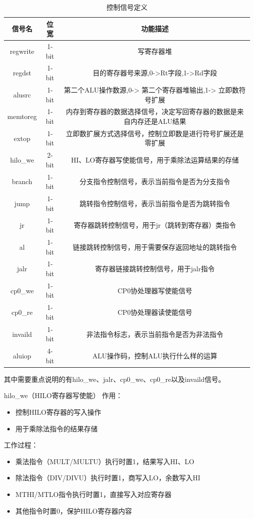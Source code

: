 \begin{table}[h]
\centering
\begin{tabular}{|c|c|c|} \hline 
	信号名&  位宽& 功能描述\\ \hline 
	regwrite&  1-bit& 写寄存器堆\\ \hline 
	regdst&  1-bit& 目的寄存器号来源,0->Rt字段,1->Rd字段\\ \hline 
	alusrc&  1-bit& 第二个ALU操作数源,0-> 第二个寄存器堆输出,1->
	立即数符号扩展\\ \hline 
	memtoreg&  1-bit& 内存到寄存器的数据选择信号，决定写回寄存器的数据是来自内存还是ALU结果\\ \hline 
	extop&  1-bit& 立即数扩展方式选择信号，控制立即数是进行符号扩展还是零扩展\\ \hline 
	hilo\_we&  2-bit& HI、LO寄存器写使能信号，用于乘除法运算结果的存储\\ \hline 
	branch&  1-bit& 分支指令控制信号，表示当前指令是否为分支指令\\ \hline 
	jump&  1-bit& 跳转指令控制信号，表示当前指令是否为跳转指令\\ \hline 
	jr&  1-bit& 寄存器跳转控制信号，用于jr（跳转到寄存器）类指令\\ \hline 
	al& 1-bit&链接跳转控制信号，用于需要保存返回地址的跳转指令\\ \hline 
	jalr& 1-bit&寄存器链接跳转控制信号，用于jalr指令\\ \hline 
	cp0\_we& 1-bit&CP0协处理器写使能信号\\ \hline 
	cp0\_re& 1-bit&CP0协处理器读使能信号\\ \hline 
	invaild& 1-bit&非法指令标志，表示当前指令是否为非法指令\\ \hline 
	aluiop& 4-bit&ALU操作码，控制ALU执行什么样的运算\\ \hline
\end{tabular}
\caption{控制信号定义}
\label{tab:my_label}
\end{table}

其中需要重点说明的有hilo\_we、jalr、cp0\_we、cp0\_re以及invaild信号。


hilo\_we（HILO寄存器写使能） 作用：

\begin{itemize}
\item 控制HILO寄存器的写入操作
\item 用于乘除法指令的结果存储
\end{itemize}
工作过程：

\begin{itemize}
\item 乘法指令（MULT/MULTU）执行时置1，结果写入HI、LO
\item 除法指令（DIV/DIVU）执行时置1，商写入LO，余数写入HI
\item MTHI/MTLO指令执行时置1，直接写入对应寄存器
\item 其他指令时置0，保护HILO寄存器内容
\end{itemize}

